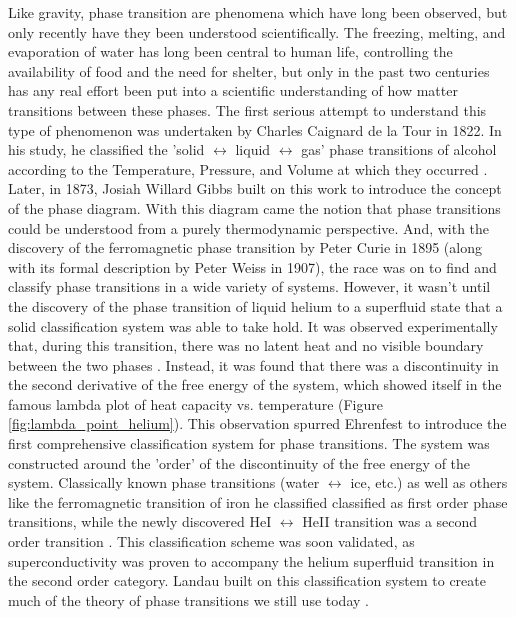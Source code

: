\documentclass[%
 reprint,
 amsmath,amssymb,
 aps,
 pra,
]{revtex4-1}
\begin{document}
Like gravity, phase transition are phenomena which have long been observed, but only recently have they been understood scientifically. The freezing, melting, and evaporation of water has long been central to human life, controlling the availability of food and the need for shelter, but only in the past two centuries has any real effort been put into a scientific understanding of how matter transitions between these phases. The first serious attempt to understand this type of phenomenon was undertaken by Charles Caignard de la Tour in 1822. In his study, he classified the 'solid $\leftrightarrow$ liquid $\leftrightarrow$ gas' phase transitions of alcohol according to the Temperature, Pressure, and Volume at which they occurred \cite{phase_history}. Later, in 1873, Josiah Willard Gibbs built on this work to introduce the concept of the phase diagram\cite{phase_history, gibbs}. With this diagram came the notion that phase transitions could be understood from a purely thermodynamic perspective. And, with the discovery of the ferromagnetic phase transition by Peter Curie in 1895 (along with its formal description by Peter Weiss in 1907), the race was on to find and classify phase transitions in a wide variety of systems. However, it wasn't until the discovery of the phase transition of liquid helium to a superfluid state that a solid classification system was able to take hold. It was observed experimentally that, during this transition, there was no latent heat and no visible boundary between the two phases \cite{phase_history}. Instead, it was found that there was a discontinuity in the second derivative of the free energy of the system, which showed itself in the famous lambda plot of heat capacity vs. temperature (Figure \ref{fig:lambda_point_helium}). This observation spurred Ehrenfest to introduce the first comprehensive classification system for phase transitions. The system was constructed around the 'order' of the discontinuity of the free energy of the system. Classically known phase transitions (water $\leftrightarrow$ ice, etc.) as well as others like the ferromagnetic transition of iron he classified classified as first order phase transitions, while the newly discovered HeI $\leftrightarrow$ HeII transition was a second order transition \cite{physics_of_phase, manual}. This classification scheme was soon validated, as superconductivity was proven to accompany the helium superfluid transition in the second order category. Landau built on this classification system to create much of the theory of phase transitions we still use today \cite{manual}.
\end{document}
